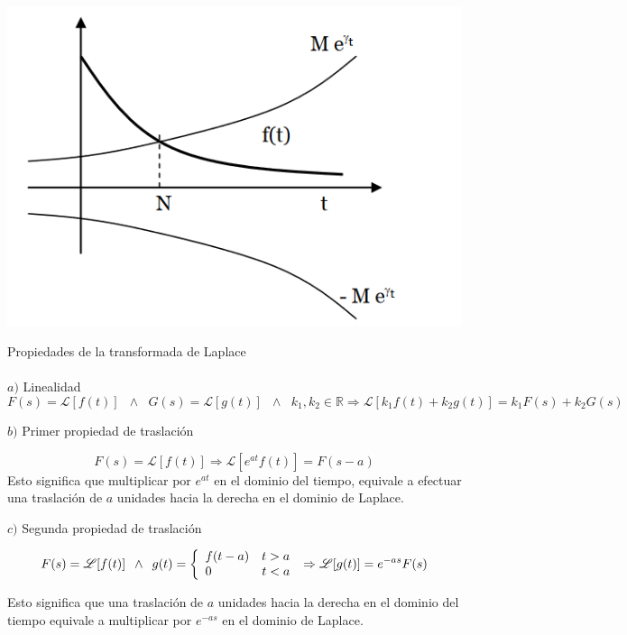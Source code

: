 \documentclass[]{article}
\begin{document}
\includegraphics{../../../Imagenes/Superior/Superior01.PNG}

\large Propiedades de la transformada de Laplace
\normalsize
\\
\\
$a)$ Linealidad
$$
F(s) = \mathscr{L}[f(t)]\hspace{7pt} \wedge\hspace{7pt} G(s) = \mathscr{L}[g(t)]\hspace{7pt} \wedge\hspace{7pt} k_{1} , k_{2} \in \mathbb{R} \Rightarrow \mathscr{L}[k_{1}f(t) + k_{2}g(t)] = k_{1} F(s) + k_{2} G(s)
$$

$b)$ Primer propiedad de traslación

$$
F(s) = \mathscr{L}[f(t)] \Rightarrow \mathscr{L}[e^{at}f(t)] = F(s-a)
$$
Esto significa que multiplicar por $e^{at}$ en el dominio del tiempo, equivale a efectuar una traslación de $a$ unidades hacia la derecha en el dominio de Laplace.


$c)$ Segunda propiedad de traslación

$$
F(s) = \mathscr{L}[f(t)] \hspace{5pt} \wedge \hspace{5pt} g(t) = \left\{
	\begin{array}{ll}
		f(t-a) \hspace{10pt} t > a \\
		0 \hspace{40pt} t < a
	\end{array}
\right. \\
\Rightarrow \mathscr{L}[g(t)] = e^{-as}F(s)
$$

Esto significa que una traslación de $a$ unidades hacia la derecha en el dominio del tiempo equivale a multiplicar por $e^{-as}$ en el dominio de Laplace.
\end{document}

